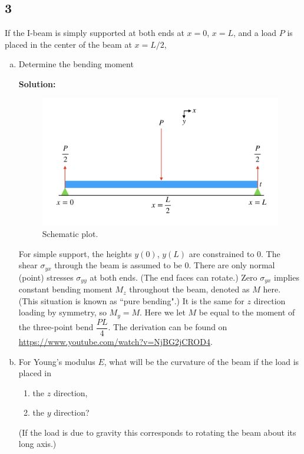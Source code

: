 \documentclass[12pt]{article}
\begin{document}
\subsection{3}
If the I-beam is simply supported at both ends at $x=0$, $x=L$, and a load $P$ is placed in the center of the beam at $x=L/2$,
\begin{enumerate}[(a)]
	\item Determine the bending moment

	      \textbf{Solution:}
	      \begin{figure}[h]
		      \centering
		      \includegraphics[width=0.6\linewidth]{images/support}
		      \caption{Schematic plot.}
		      \label{fig:support}
	      \end{figure}
	      For simple support, the heights $y(0)$, $y(L)$ are constrained to $0$.
	      The shear $\sigma_{yx}$ through the beam is assumed to be $0$.
	      There are only normal (point) stresses $\sigma_{yy}$ at both ends. (The end faces can rotate.)
	      Zero $\sigma_{yx}$ implies constant bending moment $M_z$ throughout the beam, denoted as
	      $M$ here. (This situation is known as ``pure bending".)
	      It is the same for $z$ direction loading by symmetry, so $M_y = M$.
	      Here we let $M$ be equal to the moment of the three-point bend $\dfrac{ P L }{ 4 }$. The derivation can be found
	      on \url{https://www.youtube.com/watch?v=NjBG2jCROD4}.

	\item For Young's modulus $E$, what will be the curvature of the beam if the load is placed in
	      \begin{enumerate}[(b1)]
		      \item the $z$ direction,
		      \item the $y$ direction?
	      \end{enumerate}
	      (If the load is due to gravity this corresponds to rotating the beam about its long axis.)


\end{enumerate}
\end{document}
